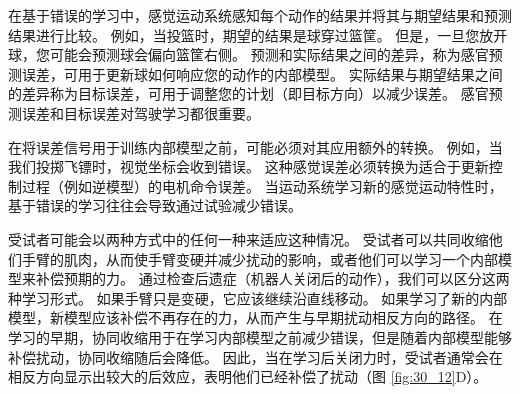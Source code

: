在基于错误的学习中，感觉运动系统感知每个动作的结果并将其与期望结果和预测结果进行比较。 例如，当投篮时，期望的结果是球穿过篮筐。 但是，一旦您放开球，您可能会预测球会偏向篮筐右侧。 预测和实际结果之间的差异，称为感官预测误差，可用于更新球如何响应您的动作的内部模型。 实际结果与期望结果之间的差异称为目标误差，可用于调整您的计划（即目标方向）以减少误差。 感官预测误差和目标误差对驾驶学习都很重要。

在将误差信号用于训练内部模型之前，可能必须对其应用额外的转换。 例如，当我们投掷飞镖时，视觉坐标会收到错误。 这种感觉误差必须转换为适合于更新控制过程（例如逆模型）的电机命令误差。 当运动系统学习新的感觉运动特性时，基于错误的学习往往会导致通过试验减少错误。

受试者可能会以两种方式中的任何一种来适应这种情况。 受试者可以共同收缩他们手臂的肌肉，从而使手臂变硬并减少扰动的影响，或者他们可以学习一个内部模型来补偿预期的力。 通过检查后遗症（机器人关闭后的动作），我们可以区分这两种学习形式。 如果手臂只是变硬，它应该继续沿直线移动。 如果学习了新的内部模型，新模型应该补偿不再存在的力，从而产生与早期扰动相反方向的路径。 在学习的早期，协同收缩用于在学习内部模型之前减少错误，但是随着内部模型能够补偿扰动，协同收缩随后会降低。
因此，当在学习后关闭力时，受试者通常会在相反方向显示出较大的后效应，表明他们已经补偿了扰动（图 \ref{fig:30_12}D）。

